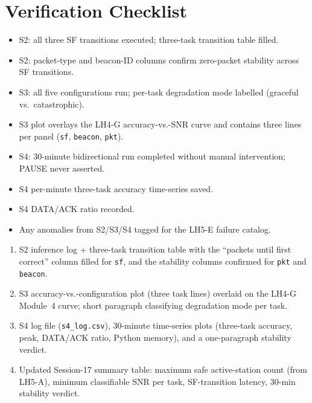 \documentclass[11pt,letterpaper]{article}
\begin{document}
\section{Verification Checklist}
\begin{itemize}[leftmargin=2em]
	\item[$\square$] S2: all three SF transitions executed; three-task transition table filled.
	\item[$\square$] S2: packet-type and beacon-ID columns confirm zero-packet stability across SF transitions.
	\item[$\square$] S3: all five configurations run; per-task degradation mode labelled (graceful vs.\ catastrophic).
	\item[$\square$] S3 plot overlays the LH4-G accuracy-vs.-SNR curve and contains three lines per panel (\texttt{sf}, \texttt{beacon}, \texttt{pkt}).
	\item[$\square$] S4: 30-minute bidirectional run completed without manual intervention; PAUSE never asserted.
	\item[$\square$] S4 per-minute three-task accuracy time-series saved.
	\item[$\square$] S4 DATA/ACK ratio recorded.
	\item[$\square$] Any anomalies from S2/S3/S4 tagged for the LH5-E failure catalog.
\end{itemize}

\begin{tcolorbox}[deliverable={Lab Handout 5-B Deliverable}]
	\begin{enumerate}[leftmargin=1.2em]
		\item S2 inference log + three-task transition table with the ``packets until first correct'' column filled for \texttt{sf}, and the stability columns confirmed for \texttt{pkt} and \texttt{beacon}.
		\item S3 accuracy-vs.-configuration plot (three task lines) overlaid on the LH4-G Module~4 curve; short paragraph classifying degradation mode per task.
		\item S4 log file (\texttt{s4\_log.csv}), 30-minute time-series plots (three-task accuracy, \FIFO{} peak, DATA/ACK ratio, Python memory), and a one-paragraph stability verdict.
		\item Updated Session-17 summary table: maximum safe active-station count (from LH5-A), minimum classifiable \mbox{SNR} per task, SF-transition latency, 30-min stability verdict.
	\end{enumerate}
\end{tcolorbox}

\printhandoutglossary
\end{document}
